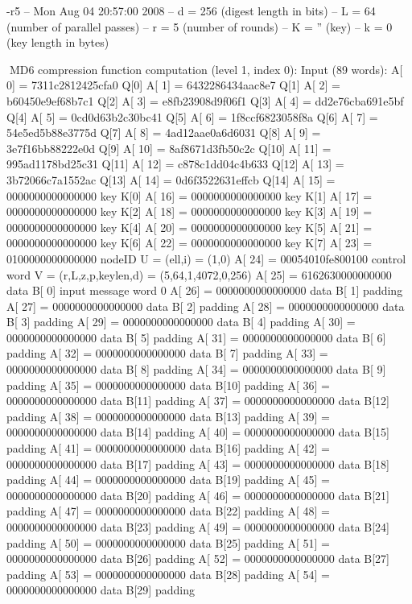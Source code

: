 -r5
-- Mon Aug 04 20:57:00 2008
-- d =    256 (digest length in bits)
-- L =     64 (number of parallel passes)
-- r =      5 (number of rounds)
-- K = '' (key)
-- k =      0 (key length in bytes)

MD6 compression function computation (level 1, index 0):
Input (89 words):
A[   0] = 7311c2812425cfa0 Q[0]
A[   1] = 6432286434aac8e7 Q[1]
A[   2] = b60450e9ef68b7c1 Q[2]
A[   3] = e8fb23908d9f06f1 Q[3]
A[   4] = dd2e76cba691e5bf Q[4]
A[   5] = 0cd0d63b2c30bc41 Q[5]
A[   6] = 1f8ccf6823058f8a Q[6]
A[   7] = 54e5ed5b88e3775d Q[7]
A[   8] = 4ad12aae0a6d6031 Q[8]
A[   9] = 3e7f16bb88222e0d Q[9]
A[  10] = 8af8671d3fb50c2c Q[10]
A[  11] = 995ad1178bd25c31 Q[11]
A[  12] = c878c1dd04c4b633 Q[12]
A[  13] = 3b72066c7a1552ac Q[13]
A[  14] = 0d6f3522631effcb Q[14]
A[  15] = 0000000000000000 key K[0]
A[  16] = 0000000000000000 key K[1]
A[  17] = 0000000000000000 key K[2]
A[  18] = 0000000000000000 key K[3]
A[  19] = 0000000000000000 key K[4]
A[  20] = 0000000000000000 key K[5]
A[  21] = 0000000000000000 key K[6]
A[  22] = 0000000000000000 key K[7]
A[  23] = 0100000000000000 nodeID U = (ell,i) = (1,0)
A[  24] = 00054010fe800100 control word V = (r,L,z,p,keylen,d) = (5,64,1,4072,0,256)
A[  25] = 6162630000000000 data B[ 0] input message word    0
A[  26] = 0000000000000000 data B[ 1] padding
A[  27] = 0000000000000000 data B[ 2] padding
A[  28] = 0000000000000000 data B[ 3] padding
A[  29] = 0000000000000000 data B[ 4] padding
A[  30] = 0000000000000000 data B[ 5] padding
A[  31] = 0000000000000000 data B[ 6] padding
A[  32] = 0000000000000000 data B[ 7] padding
A[  33] = 0000000000000000 data B[ 8] padding
A[  34] = 0000000000000000 data B[ 9] padding
A[  35] = 0000000000000000 data B[10] padding
A[  36] = 0000000000000000 data B[11] padding
A[  37] = 0000000000000000 data B[12] padding
A[  38] = 0000000000000000 data B[13] padding
A[  39] = 0000000000000000 data B[14] padding
A[  40] = 0000000000000000 data B[15] padding
A[  41] = 0000000000000000 data B[16] padding
A[  42] = 0000000000000000 data B[17] padding
A[  43] = 0000000000000000 data B[18] padding
A[  44] = 0000000000000000 data B[19] padding
A[  45] = 0000000000000000 data B[20] padding
A[  46] = 0000000000000000 data B[21] padding
A[  47] = 0000000000000000 data B[22] padding
A[  48] = 0000000000000000 data B[23] padding
A[  49] = 0000000000000000 data B[24] padding
A[  50] = 0000000000000000 data B[25] padding
A[  51] = 0000000000000000 data B[26] padding
A[  52] = 0000000000000000 data B[27] padding
A[  53] = 0000000000000000 data B[28] padding
A[  54] = 0000000000000000 data B[29] padding
